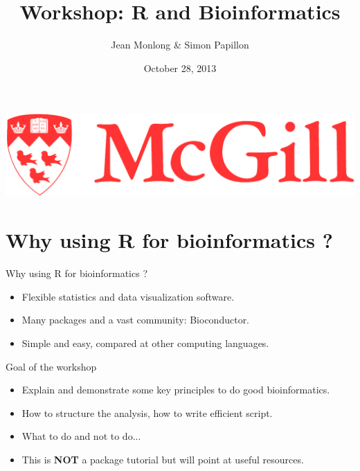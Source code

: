 \documentclass[10pt]{beamer}
\title{Workshop: R and Bioinformatics}
\author{Jean Monlong \& Simon Papillon}
\institute{Human Genetics department}
\date{October 28, 2013}
\begin{document}
\begin{frame}
  \titlepage
  \centering
  \includegraphics[page=1,height=.1\textheight]{imgs/McGill-Logo1.png}

\end{frame}

\section{Why using R for bioinformatics ?}

\begin{frame}[label=handout]{Why using R for bioinformatics ?}
  \begin{itemize}
  \item Flexible statistics and data visualization software.
  \item Many packages and a vast community: Bioconductor.
  \item Simple and easy, compared at other computing languages.
  \end{itemize}
\end{frame}


\begin{frame}[label=handout]{Goal of the workshop}
  \begin{itemize}
  \item Explain and demonstrate some key principles to do good bioinformatics.
  \item How to structure the analysis, how to write efficient script. 
  \item What to do and not to do...
    \bigskip
  \item This is {\bf NOT} a package tutorial but will point at useful resources.
  \end{itemize}
\end{frame}
\end{document}
